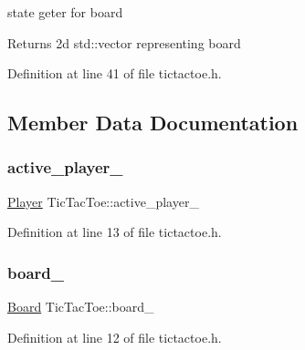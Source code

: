 state geter for board 

\begin{DoxyReturn}{Returns}
2d std\+::vector representing board 
\end{DoxyReturn}


Definition at line 41 of file tictactoe.\+h.



\subsection{Member Data Documentation}
\mbox{\label{class_tic_tac_toe_a5acba985df8b3d158783a5f4f3521f2e}} 
\subsubsection{\texorpdfstring{active\+\_\+player\+\_\+}{active\_player\_}}
{\footnotesize\ttfamily \hyperlink{common__defs_8h_a9c8780378078e51e7c9041cbac392db9}{Player} Tic\+Tac\+Toe\+::active\+\_\+player\+\_\+\hspace{0.3cm}{\ttfamily [protected]}}



Definition at line 13 of file tictactoe.\+h.

\mbox{\label{class_tic_tac_toe_a577cac99116dca16cfa05890152c2d55}} 
\subsubsection{\texorpdfstring{board\+\_\+}{board\_}}
{\footnotesize\ttfamily \hyperlink{common__defs_8h_a0dc5e1c0d1c3d4b1e210c805de5ca27b}{Board} Tic\+Tac\+Toe\+::board\+\_\+\hspace{0.3cm}{\ttfamily [protected]}}



Definition at line 12 of file tictactoe.\+h.

\mbox{\label{class_tic_tac_toe_afc64aed11c9b53b699c61a8cc3b58dc2}} 
